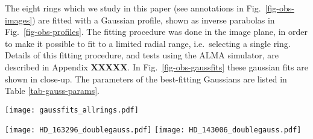 \documentclass{aa}
\begin{document}
The eight rings which we study in this paper (see annotations in
Fig.~\ref{fig-obs-images}) are fitted with a Gaussian profile, shown as inverse
parabolas in Fig.\ \ref{fig-obs-profiles}. The fitting procedure was done in the
image plane, in order to make it possible to fit to a limited radial range,
i.e.\ selecting a single ring. Details of this fitting procedure, and tests
using the ALMA simulator, are described in Appendix {\bf XXXXX}. In
Fig.~\ref{fig-obs-gaussfits} these gaussian fits are shown in close-up. The
parameters of the best-fitting Gaussians are listed in Table
\ref{tab-gauss-params}.

\begin{figure*}
\centerline{\texttt{[image: gaussfits\_allrings.pdf]}}
\caption{\label{fig-obs-gaussfits}Gaussian fits to the eight rings of this
  paper. The blue curves are the observations, the green curves are the best fit
  Gaussian profiles. The ``fit range'' bar shows the radial range within which
  the Gauss was fitted to the data. The fit range was chosen to fit the part of
  the curve that, by eye, most resembles a Gaussian. The ``beam'' bar shows the
  FWHM beam size of the observations. The grey band around the blue curve shows
  the estimated uncertainty of the data.}
\end{figure*}

\begin{figure*}
  \centerline{
    \texttt{[image: HD\_163296\_doublegauss.pdf]}
    \texttt{[image: HD\_143006\_doublegauss.pdf]}
  }
  \caption{\label{fig-obs-doublegauss}The sum of the two Gaussian fits
    for the two sources with two partly overlapping rings: HD 163296 and
    HD 143006.}
\end{figure*}
\end{document}

